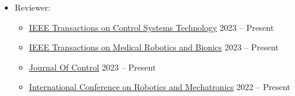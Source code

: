 \documentclass[11pt,a4paper,sans]{moderncv} %
\begin{document}
\begin{itemize}
		\item Reviewer:
		\begin{itemize}
			\item {} \href{https://ieeexplore.ieee.org/xpl/RecentIssue.jsp?punumber=87}{IEEE Transactions on Control Systems Technology} \hfill 2023 -- Present
			\item {} \href{https://ieeexplore.ieee.org/xpl/RecentIssue.jsp?punumber=8253409}{IEEE Transactions on Medical Robotics and Bionics} \hfill 2023 -- Present
			\item {}  \href{https://joc.kntu.ac.ir/en}{Journal Of Control} \hfill 2023 -- Present
			\item {} \href{https://icrom.ir/}{International Conference on Robotics and Mechatronics} \hfill 2022 -- Present


\end{itemize}
\end{itemize}
\end{document}
